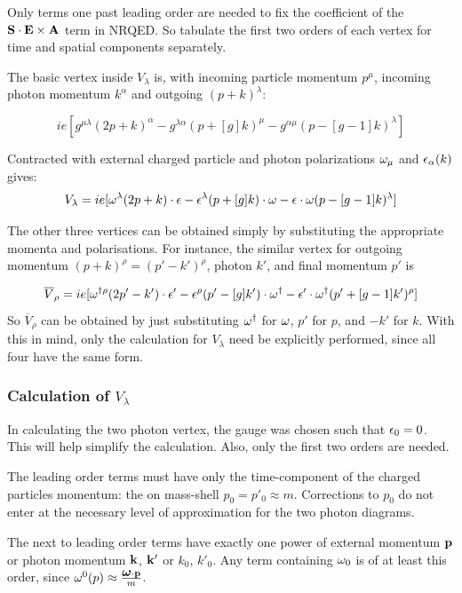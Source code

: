 Only terms one past leading order are needed to fix the coefficient of the $\mathbf{S} \cdot \mathbf{E} \times \mathbf{A}$ term in NRQED.  So tabulate the first two orders of each vertex for time and spatial components separately.  




The basic vertex inside $V_\lambda$ is, with incoming particle momentum $p^\mu$, incoming photon momentum $k^\alpha$ and outgoing $(p+k)^\lambda$:

\[
	ie[ g^{\mu\lambda}(2p + k)^\alpha - g^{\lambda \alpha} (p + [g]k)^\mu - g^{\alpha \mu} (p-[g-1]k)^\lambda ]
\]

Contracted with external charged particle and photon polarizations $\omega_\mu$ and $\epsilon_\alpha(k)$ gives:
\[
	V_\lambda = ie[\omega^\lambda (2p + k) \cdot \epsilon - \epsilon^\lambda (p+[g]k) \cdot \omega - \epsilon \cdot \omega (p-[g-1]k)^\lambda ]
\]
  
The other three vertices can be obtained simply by substituting the appropriate momenta and polarisations.  For instance, the similar vertex for outgoing momentum $(p+k)^\rho = (p' - k')^\rho$, photon $k'$, and final momentum $p'$ is

\[
	\overline{V}_\rho = ie[\omega^{\dagger\rho} (2p' - k') \cdot \epsilon' - \epsilon^\rho (p'-[g]k') \cdot \omega^\dagger  - \epsilon' \cdot \omega^\dagger  (p'+[g-1]k')^\rho ]
\]
So $\overline{V}_\rho$ can be obtained by just substituting $\omega^\dagger$ for $\omega$, $p'$ for $p$, and $-k'$ for $k$.  With this in mind, only the calculation for $V_\lambda$ need be explicitly performed, since all four have the same form.



\subsubsection{Calculation of $V_\lambda$}
In calculating the two photon vertex, the gauge was chosen such that $\epsilon_0=0$.  This will help simplify the calculation.  Also, only the first two orders are needed.

The leading order terms must have only the time-component of the charged particles momentum: the on mass-shell $p_0 = p'_0 \approx m$.  Corrections to $p_0$ do not enter at the necessary level of approximation for the two photon diagrams. 

The next to leading order terms have exactly one power of external momentum $\mathbf{p}$ or photon momentum $\mathbf{k}$, $\mathbf{k'}$ or $k_0$, $k'_0$.  Any term containing $\omega_0$ is of at least this order, since $\omega^0(p) \approx \frac{\mbox{\boldmath$ \omega $} \cdot \mathbf{p}}{m}$.

